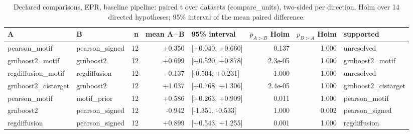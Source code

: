 \begin{table}[H]\centering\small
\caption{Declared comparisons, EPR, baseline pipeline: paired t over datasets (compare\_units), two-sided per direction, Holm over 14 directed hypotheses; 95\% interval of the mean paired difference.}
\begin{tabular}{llrrlrrl}\toprule
A & B & n & mean A$-$B & 95\% interval & $p_{A>B}$ Holm & $p_{B>A}$ Holm & supported \\ \midrule
pearson\_motif & pearson\_signed & 12 & +0.350 & [+0.040, +0.660] & 0.137 & 1.000 & unresolved \\
grnboost2\_motif & grnboost2 & 12 & +0.699 & [+0.520, +0.878] & 2.3e-05 & 1.000 & grnboost2\_motif \\
regdiffusion\_motif & regdiffusion & 12 & -0.137 & [-0.504, +0.231] & 1.000 & 1.000 & unresolved \\
grnboost2\_cistarget & grnboost2 & 12 & +1.037 & [+0.768, +1.306] & 2.4e-05 & 1.000 & grnboost2\_cistarget \\
pearson\_motif & motif\_prior & 12 & +0.586 & [+0.263, +0.909] & 0.011 & 1.000 & pearson\_motif \\
grnboost2 & pearson\_signed & 12 & -0.942 & [-1.351, -0.533] & 1.000 & 0.002 & pearson\_signed \\
regdiffusion & pearson\_signed & 12 & +0.899 & [+0.543, +1.255] & 0.001 & 1.000 & regdiffusion \\
\bottomrule\end{tabular}\end{table}
